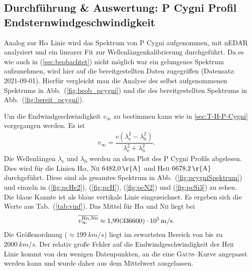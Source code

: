 \subsection{Durchführung \& Auswertung: P Cygni Profil\\Endsternwindgeschwindigkeit}
Analog zur H$\alpha $ Linie wird das Spektrum von P Cygni aufgenommen, mit nEDAR analysiert und ein linearer Fit zur Wellenlängenkalibrierung durchgeführt.
Da es wie auch in (\ref{sec:beobachtet}) nicht möglich war ein gelungenes Spektrum aufzunehmen, wird hier auf die bereitgestellten Daten zugegriffen (Datensatz: 2021-09-01).
Hierfür vergleicht man die Analyse des selbst aufgenommenen Spektrums in Abb.\ (\ref{fig:beob_pcygni}) und die des bereitgestellten Spektrums in Abb.\ (\ref{fig:bereit_pcygni}).

Um die Endwindgeschwindigkeit $v_\infty$ zu bestimmen kann wie in \ref{sec:T-H-P-Cygni} vorgegangen werden.
Es ist
\begin{align} 
  v_\infty=\dfrac{c\left(\lambda _\text{e}^2-\lambda _\text{b}^2\right)}{\lambda _\text{e}^2+\lambda _\text{b}^2}
.\end{align} 
Die Wellenlängen $\lambda _\text{e}$ und $\lambda _\text{b}$ werden an dem Plot des P Cygni Profils abgelesen.
Dies wird für die Linien H$\alpha$, N\textsc{ii} $\SI{6482,0}{\r{A}}$ und He\textsc{ii} $\SI{6678,2}{\r{A}}$ durchgeführt.  
Diese sind als gesamtes Spektrum in Abb.\ (\ref{fig:pcygniSpektrum}) und einzeln in (\ref{fig:pcHe2}), (\ref{fig:pcH}), (\ref{fig:pcN2}) und (\ref{fig:pcSi3}) zu sehen.
Die blaue Kannte ist als blaue vertikale Linie eingezeichnet.
Es ergeben sich die Werte aus Tab.\ (\ref{tab:vinf}).
Das Mittel für H$\alpha $ und N\textsc{ii} liegt bei
\begin{align} 
  \overline{v_\infty^{\text{H}\alpha ,\text{N}\textsc{ii}}}\approx \SI{1.99+-3366e+5}{m/s}
.\end{align} 
Die Größenordnung ($\approx \SI{199}{km/s}$) liegt im erwarteten Bereich von bis zu $\SI{2000}{km/s}$.
Der relativ große Fehler auf die Endwindgeschwindigkeit der He\textsc{ii} Linie kommt von den wenigen Datenpunkten, an die eine \textsc{Gauss}--Kurve angepasst werden kann und wurde daher aus dem Mittelwert ausgelassen.
